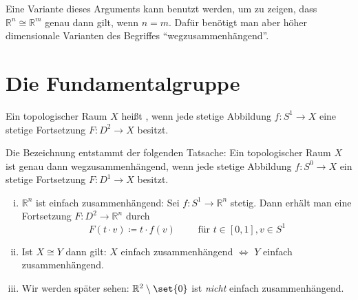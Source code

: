 Eine Variante dieses Arguments kann benutzt werden, um zu zeigen, dass $\mathbb{R}^n \cong \mathbb{R}^m$ genau dann gilt, wenn $n=m$. 
Dafür benötigt man aber höher dimensionale Varianten des Begriffes \enquote{wegzusammenhängend}.

\newpage
\section{Die Fundamentalgruppe} %
\label{sec:die_fundamentalgruppe}

\begin{definition}[{name=[einfach zusammenhängend]}]
	Ein topologischer Raum $X$ heißt , wenn jede stetige Abbildung $f \colon S^1 \to X$ eine stetige Fortsetzung $F \colon D^2 \to X$ besitzt.
\end{definition}

Die Bezeichnung entstammt der folgenden Tatsache:
Ein topologischer Raum $X$ ist genau dann wegzusammenhängend, wenn jede stetige Abbildung $f \colon S^0 \to X$ ein stetige Fortsetzung $F \colon D^1 \to X$ besitzt.

\begin{bemerkung}
	\begin{enumerate}[(i)]
		\item $\mathbb{R}^n$ ist einfach zusammenhängend: Sei $f \colon S^1 \to \mathbb{R}^n$ stetig. 
		Dann erhält man eine Fortsetzung $F \colon D^2 \to \mathbb{R}^n$ durch
		\[
			F(t \cdot v) \coloneqq t \cdot f(v) \qquad \text{ für } t \in [0,1], v \in S^1
		\]
		\item Ist $X \cong Y$ dann gilt: $X$ einfach zusammenhängend $\iff$ $Y$ einfach zusammenhängend.
		\item Wir werden später sehen: $\mathbb{R}^2 \setminus \set{0}$ ist \emph{nicht} einfach zusammenhängend.
	\end{enumerate}
\end{bemerkung}

